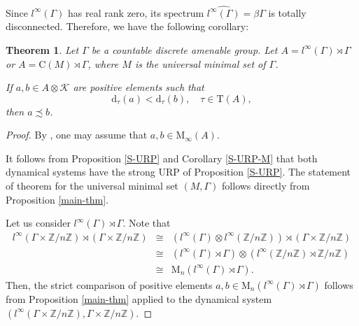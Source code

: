 \documentclass[12pt, oneside, psamsfonts]{amsart}
\newtheorem{thm}{Theorem}[section]
\theoremstyle{definition}
\theoremstyle{remark}
\numberwithin{equation}{section}
\newcommand{\Int}{\mathbb Z}
\newcommand{\tr}{\mathrm{T}}
\begin{document}
Since $l^\infty(\Gamma)$ has real rank zero, its spectrum $\widehat{l^\infty(\Gamma)} = \beta\Gamma$ is totally disconnected. Therefore, we have the following corollary:
\begin{thm}\label{cp-gp}
Let $\Gamma$ be a countable discrete amenable group. Let $A = l^\infty(\Gamma) \rtimes \Gamma$ or $A = \mathrm{C}(M)\rtimes\Gamma$, where $M$ is the universal minimal set of $\Gamma$. 

If $a, b \in A \otimes \mathcal K$ are positive elements such that $$\mathrm{d}_\tau(a) < \mathrm{d}_\tau(b),\quad \tau \in \tr(A),$$ then $a \precsim b$.
\end{thm}

\begin{proof}
By \cite{RC-5-person}, one may assume that $a , b \in \mathrm{M}_\infty(A)$.

It follows from Proposition \ref{S-URP} and Corollary \ref{S-URP-M} that both dynamical systems have the strong URP of Proposition \ref{S-URP}. The statement of theorem for the universal minimal set $(M, \Gamma)$ follows directly from Proposition \ref{main-thm}.

Let us consider $l^\infty(\Gamma)\rtimes \Gamma$. 
Note that 
\begin{eqnarray*}
l^\infty( \Gamma \times \Int/n\Int) \rtimes (\Gamma \times \Int/n\Int) 
& \cong & (l^\infty(\Gamma) \otimes l^\infty(\Int/n\Int)) \rtimes (\Gamma \times \Int/n\Int)  \\ 
& \cong & (l^\infty(\Gamma) \rtimes \Gamma) \otimes (l^\infty(\Int/n\Int) \rtimes \Int/n\Int) \\
& \cong & \mathrm{M}_n(l^\infty(\Gamma) \rtimes \Gamma). 
\end{eqnarray*}
Then, the strict comparison of positive elements $a, b \in \mathrm{M}_n(l^\infty(\Gamma) \rtimes \Gamma)$ follows from Proposition \ref{main-thm} applied to the dynamical system $(l^\infty(\Gamma \times \Int/n\Int), \Gamma \times \Int/n\Int)$. 
\end{proof}
\end{document}
